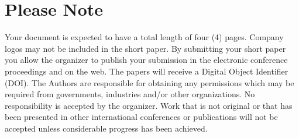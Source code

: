 \documentclass{ama}
\begin{document}
\printbibliography{}

\section{Please Note}
Your document is expected to have a total length of four (4) pages.
Company logos may not be included in the short paper.
By submitting your short paper you allow the organizer to publish your submission in the electronic conference proceedings and on the web.
The papers will receive a Digital Object Identifier (DOI).
The Authors are responsible for obtaining any permissions which may be required from governments, industries and/or other organizations.
No responsibility is accepted by the organizer.
Work that is not original or that has been presented in other international conferences or publications will not be accepted unless considerable progress has been achieved.
\end{document}

